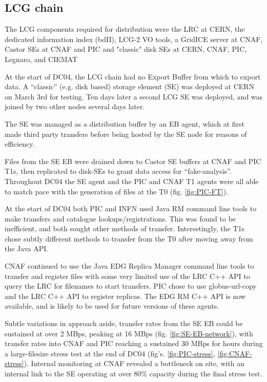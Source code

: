 \documentclass{cmspaper}
\begin{document}
\subsection{LCG chain}
The LCG components required for distribution were the LRC at CERN, the
dedicated information index (bdII), LCG-2 VO tools, a GridICE server
at CNAF, Castor SEs at CNAF and PIC and "classic" disk SEs at CERN,
CNAF, PIC, Legnaro, and CIEMAT

At the start of DC04, the LCG chain had no Export Buffer from which to
export data. A ``classic'' (e.g. disk based) storage element (SE) was
deployed at CERN on March 3rd for testing. Ten days later a second LCG
SE was deployed, and was joined by two other nodes several days later.

The SE was managed as a distribution buffer by an EB agent, which at
first made third party transfers before being hosted by the SE node
for reasons of efficiency.

Files from the SE EB were drained down to Castor SE buffers at CNAF
and PIC T1s, then replicated to disk-SEs to grant data access for
``fake-analysis''. Throughout DC04 the SE agent and the PIC and CNAF
T1 agents were all able to match pace with the generation of files at
the T0 (fig. \ref{fig:PIC-FT}).

At the start of DC04 both PIC and INFN used Java RM command line tools
to make transfers and catalogue lookups/registrations. This was found
to be inefficient, and both sought other methods of
transfer. Interestingly, the T1s chose subtly different methods to
transfer from the T0 after moving away from the Java API.

CNAF continued to use the Java EDG Replica Manager command line tools
to transfer and register files with some very limited use of the LRC
C++ API to query the LRC for filenames to start transfers. PIC chose
to use globus-url-copy and the LRC C++ API to register replicas. The
EDG RM C++ API is now available, and is likely to be used for future
versions of these agents.

Subtle variations in approach aside, transfer rates from the SE EB
could be sustained at over 2 MBps, peaking at 16 MBps
(fig. \ref{fig:SE-EB-network}), with transfer rates into CNAF and PIC
reaching a sustained 30 MBps for hours during a large-filesize stress
test at the end of DC04 (fig's. \ref{fig:PIC-stress},
\ref{fig:CNAF-stress}). Internal monitoring at CNAF revealed a
bottleneck on site, with an internal link to the SE operating at over
80\% capacity during the final stress test.
\end{document}
